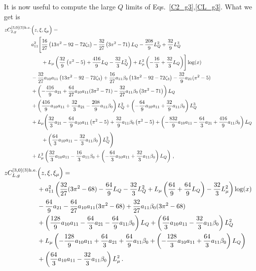 \documentclass[a4paper]{article}
\begin{document}
\endgroup

It is now useful to compute the large $Q$ limits of Eqs.~\eqref{C2_g3},\eqref{CL_g3}. What we get is
\begingroup
\allowdisplaybreaks
\begin{align}
		z C_{2,g}^{[3, 0](3) \rm h.e.}&\Bigl(z,\xi,\xi_\mu\Bigr)= \notag\\
		& a_{11}^2 \Biggl[\frac{16}{27} \left(13 \pi^2 -92- 72 \zeta_3\right) -\frac{32}{27} \left(3 \pi^2 - 71\right) L_Q - \frac{208}{9} L_Q^2 + \frac{32}{9} L_Q^3 \notag \\
		& \qquad + L_\mu \left(\frac{32}{9} \left( \pi^2 - 5\right) + \frac{416}{9} L_Q - \frac{32}{3} L_Q^2 \right) + L_\mu^2 \left(-\frac{16}{3} + \frac{32}{3} L_Q\right)\Biggr] \log(x) \notag\\
		& - \frac{32}{27} a_{10} a_{11} \left(13 \pi^2 -92- 72 \zeta_3\right) + \frac{16}{27} a_{11} \beta_0 \left(13 \pi^2 -92- 72 \zeta_3\right) -\frac{32}{9} a_{21} (\pi^2 - 5)\notag\\
		& + \left(-\frac{416}{9} a_{21} + \frac{64}{27} a_{10} a_{11} (3 \pi^2 - 71) - \frac{32}{27} a_{11} \beta_0 \left(3 \pi^2 - 71\right)\right) L_Q \notag\\
		& + \left( \frac{416}{9} a_{10} a_{11} + \frac{32}{3} a_{21} - \frac{208}{9} a_{11} \beta_0 \right) L_Q^2 + \left(-\frac{64}{9} a_{10} a_{11} + \frac{32}{9} a_{11} \beta_0 \right) L_Q^3 \notag\\
		& + L_\mu \Biggl( \frac{32}{3} a_{21} - \frac{64}{9} a_{10} a_{11} \left(\pi^2 - 5\right) + \frac{32}{9} a_{11} \beta_0 \left( \pi^2 - 5\right) + \left(-\frac{832}{9} a_{10} a_{11} - \frac{64}{3} a_{21} + \frac{416}{9} a_{11} \beta_0 \right)L_Q \notag\\
		& \qquad + \left( \frac{64}{3} a_{10} a_{11} - \frac{32}{3} a_{11} \beta_0\right) L_Q^2\Biggr) \notag\\
		& + L_\mu^2 \left( \frac{32}{3} a_{10} a_{11} - \frac{16}{3} a_{11} \beta_0 + \left(-\frac{64}{3} a_{10} a_{11} + \frac{32}{3} a_{11} \beta_0 \right) L_Q \right)\,,
\end{align}
\endgroup
\begingroup
\allowdisplaybreaks
\begin{align}
		z C_{L,g}^{[3, 0](3) \rm h.e.}&\Bigl(z,\xi,\xi_\mu\Bigr)= \notag\\
		& + a_{11}^2 \left(\frac{32}{27} (3 \pi^2 - 68) - \frac{64}{9} L_Q - \frac{32}{3} L_Q^2 + L_\mu \left(\frac{64}{9} + \frac{64}{9} L_Q\right)- \frac{32}{3} L_\mu^2\right) \log(x) \notag\\
		& -\frac{64}{9} a_{21} - \frac{64}{27} a_{10} a_{11} (3 \pi^2 - 68) +  \frac{32}{27} a_{11} \beta_0 (3 \pi^2 - 68)\notag \\
		&  + \left(\frac{128}{9} a_{10} a_{11} - \frac{64}{3} a_{21} - \frac{64}{9} a_{11} \beta_0\right) L_Q + \left(\frac{64}{3} a_{10} a_{11} - \frac{32}{3} a_{11} \beta_0\right) L_Q^2\notag\\
		& + L_\mu \left(-\frac{128}{9} a_{10} a_{11} + \frac{64}{3} a_{21} + \frac{64}{9} a_{11} \beta_0 +\left(- \frac{128}{3} a_{10} a_{11} + \frac{64}{3} a_{11} \beta_0 \right)L_Q\right) \notag\\
		& + \left(\frac{64}{3} a_{10} a_{11} - \frac{32}{3} a_{11} \beta_0\right) L_\mu^2\,.
	\end{align}
\end{document}
